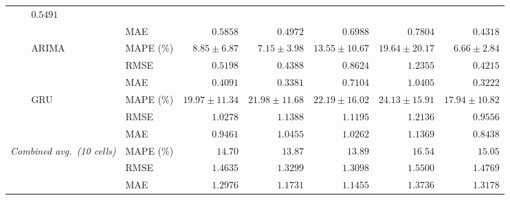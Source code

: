 \begin{table}[!p]
\begin{tabular}{ll l rrrr || r}
      & $\mathbf{0.5491}$ \\
  & & MAE
      & $0.5858$ & $0.4972$ & $0.6988$ & $0.7804$
      & $\mathbf{0.4318}$ \\
\cmidrule{2-8}
  & \multirow{3}{*}{ARIMA}
    & MAPE (\%)
      & $8.85 \pm 6.87$ & $7.15 \pm 3.98$ & $13.55 \pm 10.67$ & $19.64 \pm 20.17$
      & $\mathbf{6.66 \pm 2.84}$ \\
  & & RMSE
      & $0.5198$ & $0.4388$ & $0.8624$ & $1.2355$
      & $\mathbf{0.4215}$ \\
  & & MAE
      & $0.4091$ & $0.3381$ & $0.7104$ & $1.0405$
      & $\mathbf{0.3222}$ \\
\cmidrule{2-8}
  & \multirow{3}{*}{GRU}
    & MAPE (\%)
      & $19.97 \pm 11.34$ & $21.98 \pm 11.68$ & $22.19 \pm 16.02$ & $24.13 \pm 15.91$
      & $\mathbf{17.94 \pm 10.82}$ \\
  & & RMSE
      & $1.0278$ & $1.1388$ & $1.1195$ & $1.2136$
      & $\mathbf{0.9556}$ \\
  & & MAE
      & $0.9461$ & $1.0455$ & $1.0262$ & $1.1369$
      & $\mathbf{0.8438}$ \\
\midrule
\multicolumn{2}{l}{\textit{Combined avg.\ (10 cells)}}
  & MAPE (\%)
    & $14.70$ & $\mathbf{13.87}$ & $13.89$ & $16.54$
    & $15.05$ \\
\multicolumn{2}{l}{}
  & RMSE
    & $1.4635$ & $1.3299$ & $\mathbf{1.3098}$ & $1.5500$
    & $1.4769$ \\
\multicolumn{2}{l}{}
  & MAE
    & $1.2976$ & $1.1731$ & $\mathbf{1.1455}$ & $1.3736$
    & $1.3178$ \\
\bottomrule
\end{tabular}
\end{table}
